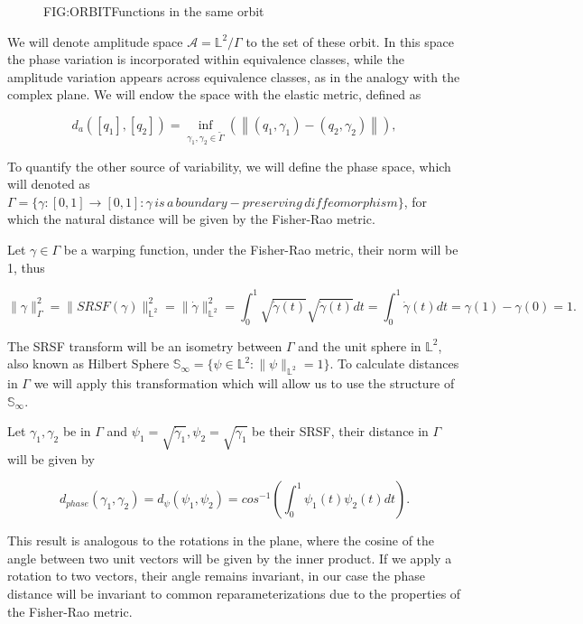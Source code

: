 \begin{figure}[Functions in the same orbit]{FIG:ORBIT}{Functions in the same orbit}
   \quad
\end{figure}

We will denote amplitude space $\mathscr{A}= \mathbb{L}^{2} / \Gamma$  to the
set of these orbit. In this space the phase variation is incorporated within
equivalence classes, while the amplitude variation appears across equivalence
classes, as in the analogy with the complex plane. We will endow the space with
the elastic metric, defined as

$$
d_{a}\left(\left[q_{1}\right],\left[q_{2}\right]\right)=\inf _{
\gamma_{1}, \gamma_{2} \in \tilde{\Gamma}}\left(\left\|\left(q_{1},
 \gamma_{1}\right)-\left(q_{2}, \gamma_{2}\right)\right\|\right),
$$

To quantify the other source of variability, we will define the phase space,
which will denoted as
$\Gamma = \{\gamma :[0,1] \rightarrow[0,1]  : \gamma \, is \, a \, boundary-preserving \, diffeomorphism\}$,
for which the natural distance will be given by the Fisher-Rao metric.

Let $\gamma \in \Gamma$ be a warping function, under the Fisher-Rao metric,
their norm will be 1, thus

$$
\| \gamma \|_\Gamma^2 = \| SRSF(\gamma)\|_{\mathbb{L}^2}^2 =  \| \dot \gamma\|_{\mathbb{L}^2}^2 =
\int_0^1 \sqrt{\dot \gamma (t)} \sqrt{\dot \gamma (t)}dt =
\int_0^1 \dot \gamma(t)dt = \gamma(1) - \gamma(0) = 1.
$$

The SRSF transform will be an isometry between $\Gamma$ and the unit sphere in
$\mathbb{L}^2$, also known as Hilbert Sphere
$\mathbb{S}_\infty = \{ \psi \in \mathbb{L}^2 : \|\psi\|_{\mathbb{L}^2}=1\}$.
To calculate distances in $\Gamma$ we will apply this transformation which will
allow us to use the structure of $\mathbb{S}_\infty$.

Let $\gamma_1, \gamma_2$ be in $\Gamma$ and $\psi_1=\sqrt{\dot \gamma_1},
\psi_2=\sqrt{\dot \gamma_1}$ be their SRSF, their distance in $\Gamma$ will be
given by

$$
d_{phase}(\gamma_1, \gamma_2) = d_{\psi}(\psi_1, \psi_2) =
cos^{-1}(\int_0^1 \psi_1(t) \psi_2(t) dt).
$$

This result is analogous to the rotations in the plane, where the cosine of
the angle between two unit vectors will be given by the inner product.
If we apply a rotation to two vectors, their angle remains invariant, in our
case the phase distance will be invariant to common reparameterizations due to
the properties of the Fisher-Rao metric.

